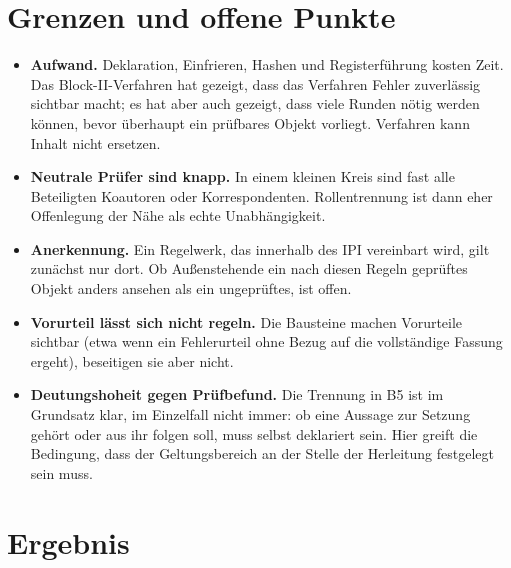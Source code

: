 \section{Grenzen und offene Punkte}

\begin{itemize}
\item \textbf{Aufwand.} Deklaration, Einfrieren, Hashen und Registerführung kosten Zeit. Das
  Block-II-Verfahren hat gezeigt, dass das Verfahren Fehler zuverlässig sichtbar macht; es hat
  aber auch gezeigt, dass viele Runden nötig werden können, bevor überhaupt ein prüfbares
  Objekt vorliegt. Verfahren kann Inhalt nicht ersetzen.
\item \textbf{Neutrale Prüfer sind knapp.} In einem kleinen Kreis sind fast alle Beteiligten
  Koautoren oder Korrespondenten. Rollentrennung ist dann eher Offenlegung der Nähe als
  echte Unabhängigkeit.
\item \textbf{Anerkennung.} Ein Regelwerk, das innerhalb des IPI vereinbart wird, gilt zunächst
  nur dort. Ob Außenstehende ein nach diesen Regeln geprüftes Objekt anders ansehen als ein
  ungeprüftes, ist offen.
\item \textbf{Vorurteil lässt sich nicht regeln.} Die Bausteine machen Vorurteile sichtbar
  (etwa wenn ein Fehlerurteil ohne Bezug auf die vollständige Fassung ergeht), beseitigen
  sie aber nicht.
\item \textbf{Deutungshoheit gegen Prüfbefund.} Die Trennung in B5 ist im Grundsatz klar, im
  Einzelfall nicht immer: ob eine Aussage zur Setzung gehört oder aus ihr folgen soll, muss
  selbst deklariert sein. Hier greift die Bedingung, dass der Geltungsbereich an der Stelle
  der Herleitung festgelegt sein muss.
\end{itemize}

\section{Ergebnis}


